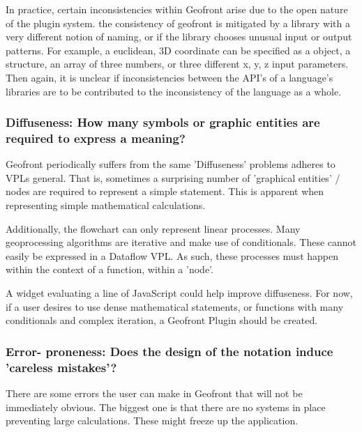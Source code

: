 In practice, certain inconsistencies within Geofront arise due to the open nature of the plugin system. 
the consistency of geofront is mitigated by a library with a very different notion of naming, or if the library chooses unusual input or output patterns. 
For example, a euclidean, 3D coordinate can be specified as a  object, a structure, an array of three numbers, or three different x, y, z input parameters.
Then again, it is unclear if inconsistencies between the API's of a language's libraries are to be contributed to the inconsistency of the language as a whole. 


\subsubsection*{Diffuseness: How many symbols or graphic entities are required to express a meaning?}

Geofront periodically suffers from the same 'Diffuseness' problems \cite{green_usability_1996} adheres to VPLs general. 
That is, sometimes a surprising number of 'graphical entities' / nodes are required to represent a simple statement.  
This is apparent when representing simple mathematical calculations. 

Additionally, the flowchart can only represent linear processes. Many geoprocessing algorithms are iterative and make use of conditionals. These cannot easily be expressed in a Dataflow VPL. As such, these processes must happen within the context of a function, within a 'node'.

A widget evaluating a line of JavaScript could help improve diffuseness. For now, if a user desires to use dense mathematical statements, or functions with many conditionals and complex iteration, a Geofront Plugin should be created.



\subsubsection*{Error- proneness: Does the design of the notation induce 'careless mistakes'?}

There are some errors the user can make  in Geofront that will not be immediately obvious. 
The biggest one is that there are no systems in place preventing large calculations. 
These might freeze up the application. 

